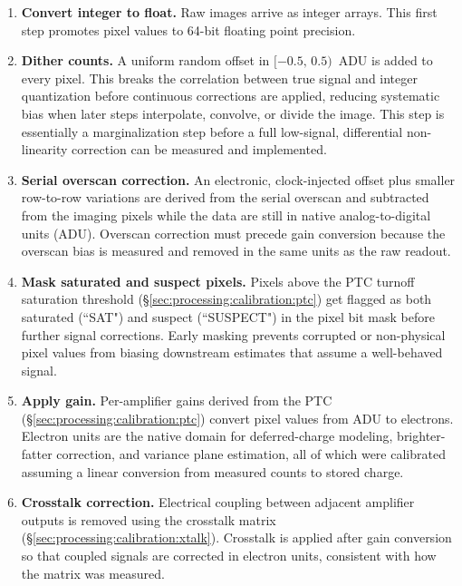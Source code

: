 \begin{enumerate}
    \item \textbf{Convert integer to float.}
    Raw images arrive as integer arrays. This first step promotes pixel values to 64-bit floating point precision.

    \item \textbf{Dither counts.}
    A uniform random offset in $[-0.5,\,0.5)$~ADU is added to every pixel.
    This breaks the correlation between true signal and integer quantization before continuous corrections are applied, reducing systematic bias when later steps interpolate, convolve, or divide the image.
    This step is essentially a marginalization step before a full low-signal, differential non-linearity correction can be measured and implemented.

    \item \textbf{Serial overscan correction.}
    An electronic, clock-injected offset plus smaller row-to-row variations are derived from the serial overscan and subtracted from the imaging pixels while the data are still in native analog-to-digital units (ADU).
    Overscan correction must precede gain conversion because the overscan bias is measured and removed in the same units as the raw readout.

    \item \textbf{Mask saturated and suspect pixels.}
    Pixels above the PTC turnoff saturation threshold (\S\ref{sec:processing:calibration:ptc}) get flagged as both saturated (``SAT") and suspect (``SUSPECT") in the pixel bit mask before further signal corrections.
    Early masking prevents corrupted or non-physical pixel values from biasing downstream estimates that assume a well-behaved signal.

    \item \textbf{Apply gain.}
    Per-amplifier gains derived from the PTC (\S\ref{sec:processing:calibration:ptc}) convert pixel values from ADU to electrons.
    Electron units are the native domain for deferred-charge modeling, brighter-fatter correction, and variance plane estimation, all of which were calibrated assuming a linear conversion from measured counts to stored charge.

    \item \textbf{Crosstalk correction.}
    Electrical coupling between adjacent amplifier outputs is removed using the crosstalk matrix (\S\ref{sec:processing:calibration:xtalk}).
    Crosstalk is applied after gain conversion so that coupled signals are corrected in electron units, consistent with how the matrix was measured.


\end{enumerate}
